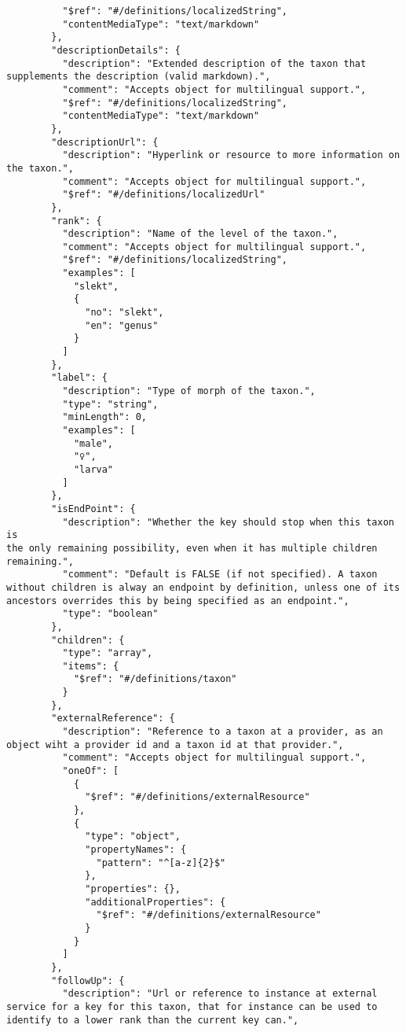 \documentclass[10pt,letterpaper]{article}
\begin{document}
\begin{verbatim}
          "$ref": "#/definitions/localizedString",
          "contentMediaType": "text/markdown"
        },
        "descriptionDetails": {
          "description": "Extended description of the taxon that
supplements the description (valid markdown).",
          "comment": "Accepts object for multilingual support.",
          "$ref": "#/definitions/localizedString",
          "contentMediaType": "text/markdown"
        },
        "descriptionUrl": {
          "description": "Hyperlink or resource to more information on
the taxon.",
          "comment": "Accepts object for multilingual support.",
          "$ref": "#/definitions/localizedUrl"
        },
        "rank": {
          "description": "Name of the level of the taxon.",
          "comment": "Accepts object for multilingual support.",
          "$ref": "#/definitions/localizedString",
          "examples": [
            "slekt",
            {
              "no": "slekt",
              "en": "genus"
            }
          ]
        },
        "label": {
          "description": "Type of morph of the taxon.",
          "type": "string",
          "minLength": 0,
          "examples": [
            "male",
            "♀",
            "larva"
          ]
        },
        "isEndPoint": {
          "description": "Whether the key should stop when this taxon is
the only remaining possibility, even when it has multiple children
remaining.",
          "comment": "Default is FALSE (if not specified). A taxon
without children is alway an endpoint by definition, unless one of its
ancestors overrides this by being specified as an endpoint.",
          "type": "boolean"
        },
        "children": {
          "type": "array",
          "items": {
            "$ref": "#/definitions/taxon"
          }
        },
        "externalReference": {
          "description": "Reference to a taxon at a provider, as an
object wiht a provider id and a taxon id at that provider.",
          "comment": "Accepts object for multilingual support.",
          "oneOf": [
            {
              "$ref": "#/definitions/externalResource"
            },
            {
              "type": "object",
              "propertyNames": {
                "pattern": "^[a-z]{2}$"
              },
              "properties": {},
              "additionalProperties": {
                "$ref": "#/definitions/externalResource"
              }
            }
          ]
        },
        "followUp": {
          "description": "Url or reference to instance at external
service for a key for this taxon, that for instance can be used to
identify to a lower rank than the current key can.",

\end{verbatim}
\end{document}

